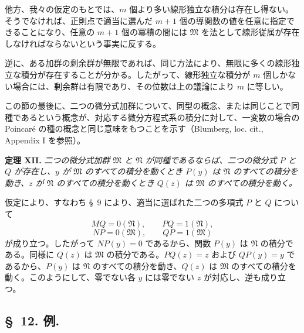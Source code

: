 他方、我々の仮定のもとでは、$m$ 個より多い線形独立な積分は存在し得ない。そうでなければ、正則点で適当に選んだ $m+1$ 個の導関数の値を任意に指定できることになり、任意の $m+1$ 個の冪積の間には $\mathfrak M$ を法として線形従属が存在しなければならないという事実に反する。

逆に、ある加群の剰余群が無限であれば、同じ方法により、無限に多くの線形独立な積分が存在することが分かる。したがって、線形独立な積分が $m$ 個しかない場合には、剰余群は有限であり、その位数は上の議論により $m$ に等しい。

この節の最後に、二つの微分式加群について、同型の概念、または同じことで同種であるという概念が、対応する微分方程式系の積分に対して、一変数の場合の Poincaré の種の概念と同じ意味をもつことを示す（Blumberg, loc. cit., Appendix I を参照）。

\textbf{定理 XII.} \emph{二つの微分式加群 $\mathfrak M$ と $\mathfrak N$ が同種であるならば、二つの微分式 $P$ と $Q$ が存在し、$y$ が $\mathfrak M$ のすべての積分を動くとき $P(y)$ は $\mathfrak N$ のすべての積分を動き、$z$ が $\mathfrak N$ のすべての積分を動くとき $Q(z)$ は $\mathfrak M$ のすべての積分を動く。}

仮定により、すなわち \S~9 により、適当に選ばれた二つの多項式 $P$ と $Q$ について
\[
 MQ=0(\mathfrak N),
 \qquad
 PQ=1(\mathfrak N),
\]
\[
 NP=0(\mathfrak M),
 \qquad
 QP=1(\mathfrak M)
\]
が成り立つ。したがって $NP(y)=0$ であるから、関数 $P(y)$ は $\mathfrak N$ の積分である。同様に $Q(z)$ は $\mathfrak M$ の積分である。$PQ(z)=z$ および $QP(y)=y$ であるから、$P(y)$ は $\mathfrak N$ のすべての積分を動き、$Q(z)$ は $\mathfrak M$ のすべての積分を動く。このようにして、零でない各 $y$ には零でない $z$ が対応し、逆も成り立つ。

\subsection*{\S~12. 例.}

